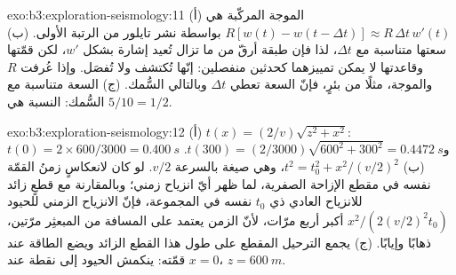 \begin{solution}{exo:b3:exploration-seismology:11}
(أ) الموجة المركّبة هي $R[w(t) - w(t - \Delta t)] \approx R\,\Delta t\,w'(t)$ بواسطة
نشر تايلور من الرتبة الأولى. (ب) سعتها متناسبة مع
$\Delta t$، لذا فإن طبقة أرقّ من  ما تزال تُعيد إشارة
بشكل $w'$، لكن قمّتها وقاعدتها لا يمكن تمييزهما كحدثين منفصلين: إنّها
تُكتشف ولا تُفصَل. وإذا عُرفت $R$ والموجة، مثلًا من
بئرٍ، فإنّ السعة تعطي $\Delta t$ وبالتالي السُّمك. (ج) السعة متناسبة
مع السُّمك: النسبة هي $5/10 = 1/2$.
\end{solution}

\begin{solution}{exo:b3:exploration-seismology:12}
(أ) $t(x) = (2/v)\sqrt{z^2 + x^2}$: $t(0) = 2\times600/3000 = \qty{0.400}{s}$
و$t(300) = (2/3000)\sqrt{600^2 + 300^2} = \qty{0.4472}{s}$. (ب) $t^2 = t_0^2 +
x^2/(v/2)^2$، وهي صيغة  بالسرعة $v/2$. لو كان لانعكاسٍ زمنُ القمّة نفسه
في مقطع الإزاحة الصفرية، لما ظهر أيّ انزياح زمني؛ وبالمقارنة مع
قطعٍ زائد للانزياح العادي ذي $t_0$ نفسه في المجموعة، فإنّ الانزياح الزمني للحيود
$x^2/(2(v/2)^2t_0)$ أكبر أربع مرّات، لأنّ الزمن يعتمد على
المسافة من المبعثِر مرّتين، ذهابًا وإيابًا. (ج) يجمع الترحيل
المقطع على طول هذا القطع الزائد ويضع الطاقة عند قمّته: ينكمش
الحيود إلى نقطة عند $x = 0$، $z = \qty{600}{m}$.
\end{solution}

